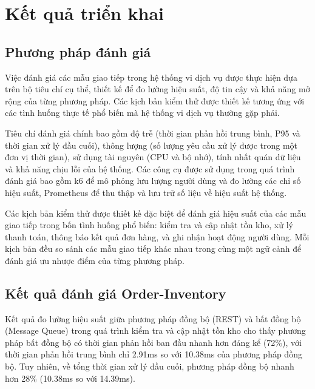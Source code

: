 \section{Kết quả triển khai}

\subsection{Phương pháp đánh giá}
Việc đánh giá các mẫu giao tiếp trong hệ thống vi dịch vụ được thực hiện dựa trên bộ tiêu chí cụ thể, thiết kế để đo lường hiệu suất, độ tin cậy và khả năng mở rộng của từng phương pháp. Các kịch bản kiểm thử được thiết kế tương ứng với các tình huống thực tế phổ biến mà hệ thống vi dịch vụ thường gặp phải.

Tiêu chí đánh giá chính bao gồm độ trễ (thời gian phản hồi trung bình, P95 và thời gian xử lý đầu cuối), thông lượng (số lượng yêu cầu xử lý được trong một đơn vị thời gian), sử dụng tài nguyên (CPU và bộ nhớ), tính nhất quán dữ liệu và khả năng chịu lỗi của hệ thống. Các công cụ được sử dụng trong quá trình đánh giá bao gồm k6 để mô phỏng lưu lượng người dùng và đo lường các chỉ số hiệu suất, Prometheus để thu thập và lưu trữ số liệu về hiệu suất hệ thống.

Các kịch bản kiểm thử được thiết kế đặc biệt để đánh giá hiệu suất của các mẫu giao tiếp trong bốn tình huống phổ biến: kiểm tra và cập nhật tồn kho, xử lý thanh toán, thông báo kết quả đơn hàng, và ghi nhận hoạt động người dùng. Mỗi kịch bản đều so sánh các mẫu giao tiếp khác nhau trong cùng một ngữ cảnh để đánh giá ưu nhược điểm của từng phương pháp.

\subsection{Kết quả đánh giá Order-Inventory}
Kết quả đo lường hiệu suất giữa phương pháp đồng bộ (REST) và bất đồng bộ (Message Queue) trong quá trình kiểm tra và cập nhật tồn kho cho thấy phương pháp bất đồng bộ có thời gian phản hồi ban đầu nhanh hơn đáng kể (72\%), với thời gian phản hồi trung bình chỉ 2.91ms so với 10.38ms của phương pháp đồng bộ. Tuy nhiên, về tổng thời gian xử lý đầu cuối, phương pháp đồng bộ nhanh hơn 28\% (10.38ms so với 14.39ms).


